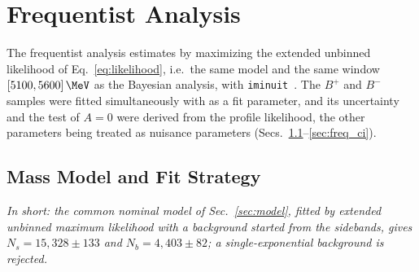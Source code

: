 \section{Frequentist Analysis}
\label{sec:frequentist}

The frequentist analysis estimates \Araw by maximizing the extended unbinned likelihood of Eq.~\eqref{eq:likelihood}, i.e.\ the same model and the same window $[5100,5600]\,\MeV$ as the Bayesian analysis, with \texttt{iminuit}~\cite{iminuit}. The $B^+$ and $B^-$ samples were fitted simultaneously with \Araw as a fit parameter, and its uncertainty and the test of $A=0$ were derived from the profile likelihood, the other parameters being treated as nuisance parameters (Secs.~\ref{sec:freq_model}--\ref{sec:freq_ci}).


\subsection{Mass Model and Fit Strategy}
\label{sec:freq_model}
\emph{In short: the common nominal model of Sec.~\ref{sec:model}, fitted by extended unbinned maximum likelihood with a background started from the sidebands, gives $N_s=15{,}328\pm133$ and $N_b=4{,}403\pm82$; a single-exponential background is rejected.}

